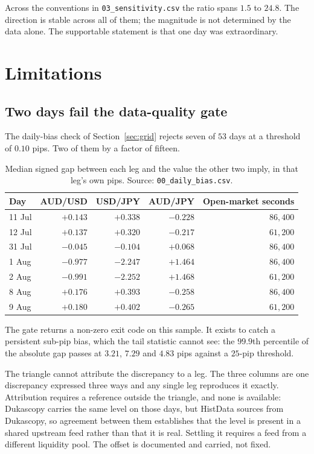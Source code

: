 \documentclass[11pt,a4paper]{article}
\newcommand{\code}[1]{\texttt{\small #1}}
\begin{document}
Across the conventions in \code{03\_sensitivity.csv} the ratio spans $1.5$ to $24.8$. The
direction is stable across all of them; the magnitude is not determined by the data alone.
The supportable statement is that one day was extraordinary.

\section{Limitations}
\label{sec:limits}

\subsection{Two days fail the data-quality gate}

The daily-bias check of Section~\ref{sec:grid} rejects seven of $53$ days at a threshold of
$0.10$ pips. Two of them by a factor of fifteen.

\begin{table}[htbp]
\centering
\small
\begin{tabular}{@{}lrrrr@{}}
\toprule
Day & AUD/USD & USD/JPY & AUD/JPY & Open-market seconds \\
\midrule
11 Jul & $+0.143$ & $+0.338$ & $-0.228$ & $86{,}400$ \\
12 Jul & $+0.137$ & $+0.320$ & $-0.217$ & $61{,}200$ \\
31 Jul & $-0.045$ & $-0.104$ & $+0.068$ & $86{,}400$ \\
1 Aug  & $-0.977$ & $-2.247$ & $+1.464$ & $86{,}400$ \\
2 Aug  & $-0.991$ & $-2.252$ & $+1.468$ & $61{,}200$ \\
8 Aug  & $+0.176$ & $+0.393$ & $-0.258$ & $86{,}400$ \\
9 Aug  & $+0.180$ & $+0.402$ & $-0.265$ & $61{,}200$ \\
\bottomrule
\end{tabular}
\caption{Median signed gap between each leg and the value the other two imply, in that leg's
own pips. Source: \code{00\_daily\_bias.csv}.}
\end{table}

The gate returns a non-zero exit code on this sample. It exists to catch a persistent
sub-pip bias, which the tail statistic cannot see: the $99.9$th percentile of the absolute
gap passes at $3.21$, $7.29$ and $4.83$ pips against a $25$-pip threshold.

The triangle cannot attribute the discrepancy to a leg. The three columns are one
discrepancy expressed three ways and any single leg reproduces it exactly. Attribution
requires a reference outside the triangle, and none is available: Dukascopy carries the same
level on those days, but HistData sources from Dukascopy, so agreement between them
establishes that the level is present in a shared upstream feed rather than that it is real.
Settling it requires a feed from a different liquidity pool. The offset is documented and
carried, not fixed.
\end{document}
